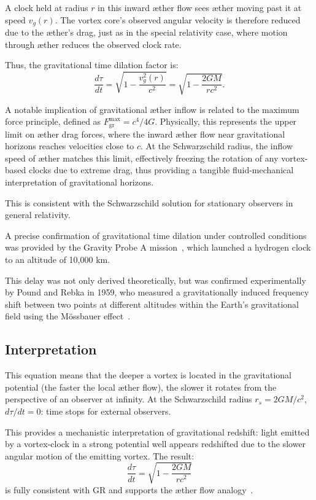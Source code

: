 \documentclass[a4paper,12pt]{article}
\begin{document}
A clock held at radius $r$ in this inward æther flow sees æther moving past it at speed $v_g(r)$. The vortex core's observed angular velocity is therefore reduced due to the æther's drag, just as in the special relativity case, where motion through æther reduces the observed clock rate.

Thus, the gravitational time dilation factor is:
\begin{equation}
\frac{d\tau}{dt} = \sqrt{1 - \frac{v_g^2(r)}{c^2}} = \sqrt{1 - \frac{2GM}{rc^2}}.
\end{equation}

A notable implication of gravitational æther inflow is related to the maximum force principle, defined as $F^{\text{max}}_{\text{gr}} = c^4 /4G$. Physically, this represents the upper limit on æther drag forces, where the inward æther flow near gravitational horizons reaches velocities close to $c$. At the Schwarzschild radius, the inflow speed of æther matches this limit, effectively freezing the rotation of any vortex-based clocks due to extreme drag, thus providing a tangible fluid-mechanical interpretation of gravitational horizons.

This is consistent with the Schwarzschild solution for stationary observers in general relativity.

A precise confirmation of gravitational time dilation under controlled conditions was provided by the Gravity Probe A mission~\cite{vessot_levine_1980}, which launched a hydrogen clock to an altitude of 10,000 km.

This delay was not only derived theoretically, but was confirmed experimentally by Pound and Rebka in 1959, who measured a gravitationally induced frequency shift between two points at different altitudes within the Earth's gravitational field using the Mössbauer effect~\cite{pound_rebka_1959}.

\subsection*{Interpretation}

This equation means that the deeper a vortex is located in the gravitational potential (the faster the local æther flow), the slower it rotates from the perspective of an observer at infinity. At the Schwarzschild radius $r_s = 2GM/c^2$, $d\tau/dt = 0$: time stops for external observers.

This provides a mechanistic interpretation of gravitational redshift: light emitted by a vortex-clock in a strong potential well appears redshifted due to the slower angular motion of the emitting vortex. The result:
\[
\boxed{\frac{d\tau}{dt} = \sqrt{1 - \frac{2GM}{rc^2}}}
\]
is fully consistent with GR and supports the æther flow analogy~\cite{Schiller2022-maxforce}.
\end{document}
